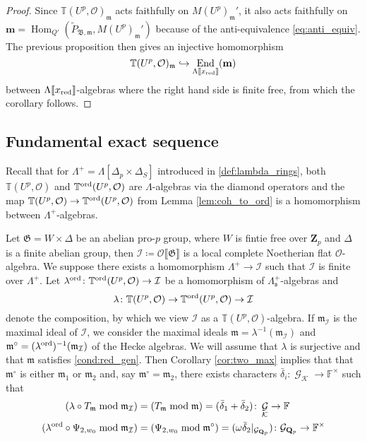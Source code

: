 \documentclass[leqno]{amsart}
\theoremstyle{definition}
\theoremstyle{remark}
\newcommand{\oo}{\mathcal{O}}
\newcommand{\fF}{\mathbb{F}} %
\newcommand{\Qp}{\mathbf{Q}_p}
\newcommand{\Zp}{\mathbf{Z}_p}
\DeclareMathOperator{\End}{End}
\DeclareMathOperator{\Hom}{Hom}
\DeclareMathOperator{\Gal}{\mathcal{G}}
\newcommand{\fm}{\mathfrak{m}}
\newcommand{\fs}{\mathfrak{s}}
\newcommand{\Gp}{\mathcal{G}_{\Qp}} %
\newcommand{\B}{\mathfrak B} %
\newcommand{\xx}{x_\textnormal{red}}
\newcommand{\K}{{\mathcal{K}}} %
\newcommand{\fG}{\mathfrak{G}}
\newcommand{\TT}{\mathbb{T}} %
\newcommand{\I}{\mathcal{I}} %
\newcommand{\ord}{\textnormal{ord}} %
\begin{document}
\begin{proof}
Since $\TT(U^p,\oo)_{\fm}$ acts faithfully on 
$M(U^p)_{\fm}'$, it also acts faithfully on
$\mathbf{m}=\Hom_{Q'}(\tilde{P}_{\B,\fm},M(U^p)_{\fm}')$ 
because of the anti-equivalence \eqref{eq:anti_equiv}.
The previous proposition then gives an injective homomorphism
\[
    \TT(U^p,\oo)_\fm\hookrightarrow
    \End_{\Lambda\llbracket\xx\rrbracket}(\mathbf{m})
\]
between $\Lambda\llbracket\xx\rrbracket$-algebras
where the right hand side is finite free,
from which the corollary follows.
\end{proof}

\subsection{Fundamental exact sequence}
\label{sub:fund_exact_sequence}

Recall that for $\Lambda^+=\Lambda[\Delta_p\times\Delta_S]$
introduced in \eqref{def:lambda_rings},
both $\TT(U^p,\oo)$ and $\TT^{\ord}(U^p,\oo)$
are $\Lambda$-algebras via the diamond operators
and the map 
$\TT(U^p,\oo)\to \TT^{\ord}(U^p,\oo)$
from Lemma \ref{lem:coh_to_ord}
is a homomorphism between $\Lambda^+$-algebras.


Let $\fG=W\times \Delta$ be an abelian pro-$p$ group,
where $W$ is fintie free over $\Zp$
and $\Delta$ is a finite abelian group,
then $\I\coloneqq\oo\llbracket\fG\rrbracket$
is a local complete Noetherian flat $\oo$-algebra.
We suppose there exists a homomorphism
$\Lambda^+\to \I$ such that 
$\I$ is finite over $\Lambda^+$.
Let $\lambda^{\ord}\colon 
\TT^{\ord}(U^p,\oo)\to\I$
be a homomorphism of $\Lambda^+_{\fs}$-algebras and
\begin{equation}
    \lambda\colon 
    \TT(U^p,\oo)\to
    \TT^{\ord}(U^p,\oo)\to\I
\end{equation}
denote the composition, by which
we view $\I$ as a $\TT(U^p,\oo)$-algebra.
If $\fm_\I$ is the maximal ideal of $\I$,
we consider the maximal ideals
$\fm=\lambda^{-1}(\fm_\I)$ 
and $\fm^\circ=(\lambda^{\ord})^{-1}(\fm_\I)$
of the Hecke algebras.
We will assume that
$\lambda$ is surjective and that 
$\fm$ satisfies \eqref{cond:red_gen}.
Then Corollary \ref{cor:two_max} implies that
that $\fm^\circ$ is either $\fm_1$ or $\fm_2$ and,
say $\fm^{\circ}=\fm_2$,
there exists characters 
$\bar{\delta}_i\colon \Gal_\K\to \fF^\times$ such that
\begin{align*}
    (\lambda\circ T_\fm\bmod \fm_\I)&=
    (T_\fm\bmod \fm)=
    (\bar{\delta}_1+\bar{\delta}_2)\colon 
    \Gal_\K\to \fF\\
    (\lambda^{\ord}\circ \Psi_{2,w_0}\bmod\fm_\I)&=
    (\Psi_{2,w_0}\bmod\fm^{\circ})=
    (\omega\bar{\delta}_2\vert_{\Gp})\colon 
    \Gp\to \fF^\times
\end{align*}
\end{document}
